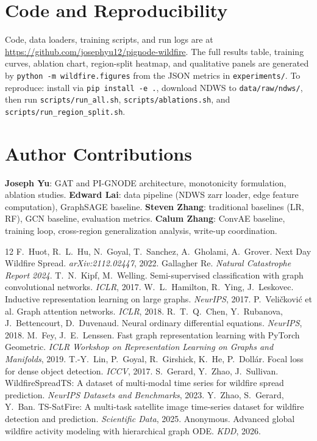 \documentclass{article}
\begin{document}
\section*{Code and Reproducibility}

Code, data loaders, training scripts, and run logs are at
\url{https://github.com/josephyu12/pignode-wildfire}. The full results table,
training curves, ablation chart, region-split heatmap, and qualitative panels
are generated by \texttt{python -m wildfire.figures} from the JSON metrics
in \texttt{experiments/}. To reproduce: install via \texttt{pip install -e .},
download NDWS to \texttt{data/raw/ndws/}, then run
\texttt{scripts/run\_all.sh}, \texttt{scripts/ablations.sh}, and
\texttt{scripts/run\_region\_split.sh}.

\section*{Author Contributions}

\textbf{Joseph Yu}: GAT and PI-GNODE architecture, monotonicity formulation,
ablation studies. \textbf{Edward Lai}: data pipeline (NDWS zarr loader, edge
feature computation), GraphSAGE baseline. \textbf{Steven Zhang}: traditional
baselines (LR, RF), GCN baseline, evaluation metrics. \textbf{Calum Zhang}:
ConvAE baseline, training loop, cross-region generalization analysis,
write-up coordination.


\begin{thebibliography}{12}
 F.\ Huot, R.\ L.\ Hu, N.\ Goyal, T.\ Sanchez, A.\ Gholami,
  A.\ Grover. Next Day Wildfire Spread. \emph{arXiv:2112.02447}, 2022.
 Gallagher Re. \emph{Natural Catastrophe Report 2024}.
 T.\ N.\ Kipf, M.\ Welling. Semi-supervised classification with
  graph convolutional networks. \emph{ICLR}, 2017.
 W.\ L.\ Hamilton, R.\ Ying, J.\ Leskovec. Inductive
  representation learning on large graphs. \emph{NeurIPS}, 2017.
 P.\ Veli\v{c}kovi\'c et al. Graph attention networks.
  \emph{ICLR}, 2018.
 R.\ T.\ Q.\ Chen, Y.\ Rubanova, J.\ Bettencourt, D.\ Duvenaud.
  Neural ordinary differential equations. \emph{NeurIPS}, 2018.
 M.\ Fey, J.\ E.\ Lenssen. Fast graph representation learning with
  PyTorch Geometric. \emph{ICLR Workshop on Representation Learning on Graphs and Manifolds}, 2019.
 T.-Y.\ Lin, P.\ Goyal, R.\ Girshick, K.\ He, P.\ Doll\'ar.
  Focal loss for dense object detection. \emph{ICCV}, 2017.
 S.\ Gerard, Y.\ Zhao, J.\ Sullivan. WildfireSpreadTS:
  A dataset of multi-modal time series for wildfire spread prediction.
  \emph{NeurIPS Datasets and Benchmarks}, 2023.
 Y.\ Zhao, S.\ Gerard, Y.\ Ban. TS-SatFire: A multi-task
  satellite image time-series dataset for wildfire detection and prediction.
  \emph{Scientific Data}, 2025.
 Anonymous. Advanced global wildfire activity modeling with
  hierarchical graph ODE. \emph{KDD}, 2026.
\end{thebibliography}
\end{document}
